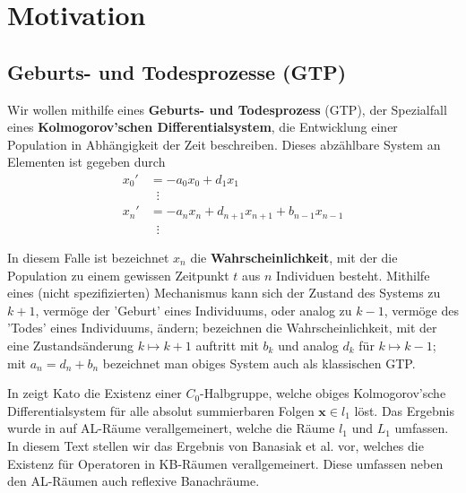 \chapter{Motivation}

\section{Geburts- und Todesprozesse (GTP)}

\par
Wir wollen mithilfe eines \textbf{Geburts- und Todesprozess} (GTP), der Spezialfall eines \textbf{Kolmogorov'schen Differentialsystem}, die Entwicklung einer Population in Abhängigkeit der Zeit beschreiben. Dieses abzählbare System an Elementen ist gegeben durch
\begin{align*}
x_0' &= -a_0x_0 + d_1 x_1\\
&\;\;\vdots\\
x_n' &= -a_nx_n + d_{n+1}x_{n+1} + b_{n-1}x_{n-1}  \\
&\;\;\vdots
\end{align*}

\par 
In diesem Falle ist bezeichnet $x_n$ die \textbf{Wahrscheinlichkeit}, mit der die Population zu einem gewissen Zeitpunkt $t$ aus $n$ Individuen besteht. Mithilfe eines (nicht spezifizierten) Mechanismus kann sich der Zustand des Systems zu $k+1$, vermöge der 'Geburt' eines Individuums, oder analog zu $k-1$, vermöge des 'Todes' eines Individuums, ändern; bezeichnen die Wahrscheinlichkeit, mit der eine Zustandsänderung $k\mapsto k+1$ auftritt mit  $b_k$ und analog $d_k$ für $k\mapsto k-1$; mit $a_n=d_n+b_n$ bezeichnet man obiges System auch als klassischen GTP.

In \cite{kato_1954} zeigt Kato die Existenz einer $C_0$-Halbgruppe, welche obiges Kolmogorov'sche Differentialsystem für alle absolut summierbaren Folgen $\textbf{x}\in l_1$ löst. Das Ergebnis wurde  in \cite{} auf AL-Räume verallgemeinert, welche die Räume $l_1$ und $L_1$ umfassen. In diesem Text stellen wir das Ergebnis von Banasiak et al.  \cite{banasiak_lachowicz_2007} vor, welches die Existenz für Operatoren in KB-Räumen verallgemeinert. Diese umfassen neben den AL-Räumen auch reflexive Banachräume. 





